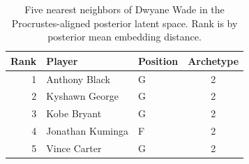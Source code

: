 \begin{table}[htbp]
  \centering\small
  \begin{tabular}{rllc}
    \toprule
    Rank & Player & Position & Archetype \\
    \midrule
    1 & Anthony Black & G & 2 \\
    2 & Kyshawn George & G & 2 \\
    3 & Kobe Bryant & G & 2 \\
    4 & Jonathan Kuminga & F & 2 \\
    5 & Vince Carter & G & 2 \\
    \bottomrule
  \end{tabular}
  \caption{Five nearest neighbors of Dwyane Wade in the Procrustes-aligned posterior latent space. Rank is by posterior mean embedding distance.}
  \label{tab:Dwyane_Wade_neighbors}
\end{table}

